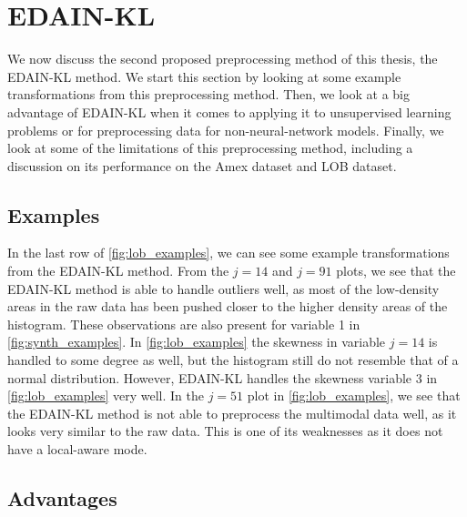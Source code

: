 \documentclass{statsmsc}
\begin{document}
{%

\section{EDAIN-KL}%
\label{sec:EDAIN-KL-discuss}


We now discuss the second proposed preprocessing method of this thesis, the \ac{EDAIN-KL} method.
We start this section by looking at some example transformations from this
preprocessing method. Then, we look at a big advantage of \ac{EDAIN-KL} when it comes to applying
it to unsupervised learning problems or for preprocessing data for non-neural-network models.
Finally, we look at some of the limitations of this preprocessing method, including a discussion
on its performance on the Amex dataset and \ac{LOB} dataset.

\subsection{Examples}%
\label{sub:Examples}

In the last row of \cref{fig:lob_examples}, we can see some example transformations from the
\ac{EDAIN-KL} method.
From the $j=14$ and $j=91$ plots, we see that the \ac{EDAIN-KL} method is able to handle outliers
well, as most of the low-density areas in the raw data has been pushed closer to the higher
density areas of the histogram. These observations are also present for variable 1
in \cref{fig:synth_examples}.
In \cref{fig:lob_examples} the skewness in variable $j=14$ is handled to some degree as well,
but the histogram still do not resemble that of a normal distribution. However, \ac{EDAIN-KL}
handles the skewness variable 3 in \cref{fig:lob_examples} very well.
In the $j=51$ plot in \cref{fig:lob_examples}, we see that the \ac{EDAIN-KL} method
is not able to preprocess the multimodal data well, as it looks very similar to the raw data.
This is one of its weaknesses as it does not have a local-aware mode.

\subsection{Advantages}%
\label{sub:edain_kl_advantages}

}
\end{document}

